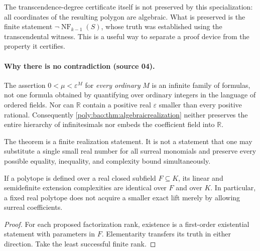 \documentclass[11pt,a4paper]{article}
\numberwithin{equation}{section}
\theoremstyle{plain}
\newcommand{\R}{\mathbb R}
\newcommand{\eps}{\varepsilon}
\newcommand{\NF}{\operatorname{NF}}
\begin{document}
The transcendence-degree certificate itself is not preserved by this
specialization: all coordinates of the resulting polygon are algebraic.
What is preserved is the finite statement $\neg\NF_{k-1}(S)$, whose
truth was established using the transcendental witness. This is a useful
way to separate a proof device from the property it certifies.

\paragraph{Why there is no contradiction (source 04).}
The assertion $0<\mu<\eps^M$ for \emph{every ordinary} $M$ is an infinite
family of formulas, not one formula obtained by quantifying over ordinary
integers in the language of ordered fields. Nor can $\R$ contain a
positive real $\eps$ smaller than every positive rational. Consequently
\cref{poly:bao:thm:algebraicrealization} neither preserves the entire hierarchy of
infinitesimals nor embeds the coefficient field into $\R$.

The theorem is a finite realization statement. It is not a statement
that one may substitute a single small real number for all surreal
monomials and preserve every possible equality, inequality, and
complexity bound simultaneously.

\medskip
\begin{corollary}
\label{poly:ic:cor:scalar}\label{poly:bao:prop:scalar}
If a polytope is defined over a real closed subfield $F\subseteq K$, its
linear and semidefinite extension complexities are identical over $F$
and over $K$. In particular, a fixed real polytope does not acquire a
smaller exact lift merely by allowing surreal coefficients.
\end{corollary}
\begin{proof}
For each proposed factorization rank, existence is a first-order
existential statement with parameters in $F$. Elementarity transfers
its truth in either direction. Take the least successful finite rank.
\end{proof}
\end{document}
